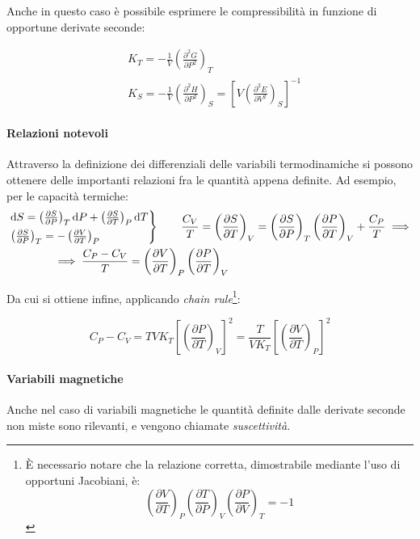 Anche in questo caso è possibile esprimere le compressibilità in funzione di opportune derivate seconde:

\begin{align*}
&K_T = - \frac{1}{V} \left(\frac{\partial^2 G}{\partial P^2}\right)_T\\
&K_S = - \frac{1}{V} \left(\frac{\partial^2 H}{\partial P^2}\right)_S = \left[ V \left(\frac{\partial^2 E}{\partial V^2}\right)_S \right]^{-1}
\end{align*}

\paragraph{Relazioni notevoli} Attraverso la definizione dei differenziali delle variabili termodinamiche si possono ottenere delle importanti relazioni fra le quantità appena definite.
Ad esempio, per le capacità termiche:
\begin{align*}
&\begin{rcases*}
\dd S = \left(\frac{\partial S}{\partial P}\right)_T \dd P + \left(\frac{\partial S}{\partial T}\right)_P \dd T\\
\left(\frac{\partial S}{\partial P}\right)_T = - \left(\frac{\partial V}{\partial T}\right)_P
\end{rcases*}
\qquad \frac{C_V}{T} = \left(\frac{\partial S}{\partial T}\right)_V = \left(\frac{\partial S}{\partial P}\right)_T \left(\frac{\partial P}{\partial T}\right)_V + \frac{C_P}{T} \implies\\
&\qquad \qquad \implies \frac{C_P - C_V}{T} = \left(\frac{\partial V}{\partial T}\right)_P \left(\frac{\partial P}{\partial T}\right)_V
\end{align*}

Da cui si ottiene infine, applicando \textit{chain rule}\footnote{\`E necessario notare che la relazione corretta, dimostrabile mediante l'uso di opportuni Jacobiani, è:
\begin{equation*}
	\left(\frac{\partial V}{\partial T}\right)_P \left(\frac{\partial T}{\partial P}\right)_V \left(\frac{\partial P}{\partial V}\right)_T = -1
\end{equation*}
}:

\begin{equation*}
C_P - C_V = T V K_T \left[\left(\frac{\partial P}{\partial T}\right)_V\right]^2 = \frac{T}{V K_T} \left[\left(\frac{\partial V}{\partial T}\right)_P\right]^2
\end{equation*}

\paragraph{Variabili magnetiche} Anche nel caso di variabili magnetiche le quantità definite dalle derivate seconde non miste sono rilevanti, e vengono chiamate \textit{suscettività.}

